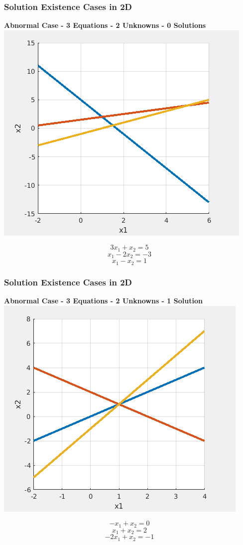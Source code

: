 \documentclass[fleqn]{beamer} %
\newcommand{\sectiontitleIII}{Solution Existence Cases in 2D}
\begin{document}
\begin{frame}\small
\frametitle{\sectiontitleIII}
{\bf Abnormal Case - 3 Equations - 2 Unknowns - 0 Solutions} \\ \vspace{2mm}
 \includegraphics[scale=.3]{lecture5_fig4.png} \\
\begin{fleqn}
\[3x_1+x_2=5\]
\[x_1-2x_2=-3\]
\[x_1-x_2=1\]
\end{fleqn}
\end{frame}

\begin{frame}\small 
\frametitle{\sectiontitleIII}
{\bf Abnormal Case - 3 Equations - 2 Unknowns - 1 Solution} \\ \vspace{2mm}
 \includegraphics[scale=.3]{lecture5_fig5.png} \\
\begin{fleqn}
\[-x_1+x_2=0\]
\[x_1+x_2=2\]
\[-2x_1+x_2=-1\]
\end{fleqn}
\end{frame}
\end{document}
